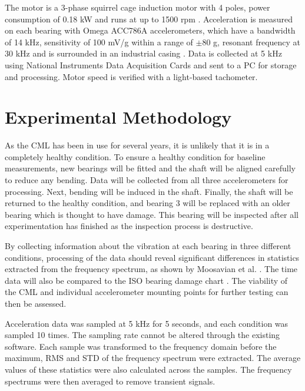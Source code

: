 The motor is a 3-phase squirrel cage induction motor with 4 poles, power consumption of 0.18 kW and runs at up to 1500 rpm \cite{CMlab_motor}.
Acceleration is measured on each bearing with Omega ACC786A accelerometers, which have a bandwidth of 14 kHz, sensitivity of 100 mV/g within a range of $\pm$80 g, resonant frequency at 30 kHz and is surrounded in an industrial casing \cite{CMlab_accelerometer}.
Data is collected at 5 kHz using National Instruments Data Acquisition Cards and sent to a PC for storage and processing.
Motor speed is verified with a light-based tachometer.

\section{Experimental Methodology}

As the CML has been in use for several years, it is unlikely that it is in a completely healthy condition.
To ensure a healthy condition for baseline measurements, new bearings will be fitted and the shaft will be aligned carefully to reduce any bending.
Data will be collected from all three accelerometers for processing.
Next, bending will be induced in the shaft.
Finally, the shaft will be returned to the healthy condition, and bearing 3 will be replaced with an older bearing which is thought to have damage.
This bearing will be inspected after all experimentation has finished as the inspection process is destructive.
\par

By collecting information about the vibration at each bearing in three different conditions, processing of the data should reveal significant differences in statistics extracted from the frequency spectrum, as shown by Moosavian et al. \cite{VIB_moosavian}.
The time data will also be compared to the ISO bearing damage chart \cite{ISO13373-3}.
The viability of the CML and individual accelerometer mounting points for further testing can then be assessed.
\par

Acceleration data was sampled at 5 kHz for 5 seconds, and each condition was sampled 10 times.
The sampling rate cannot be altered through the existing software.
Each sample was transformed to the frequency domain before the maximum, RMS and STD of the frequency spectrum were extracted.
The average values of these statistics were also calculated across the samples.
The frequency spectrums were then averaged to remove transient signals.
\par


